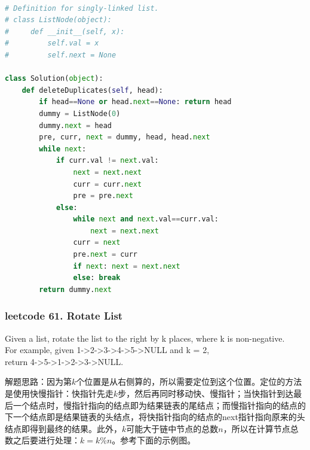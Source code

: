 \documentclass[a4paper,10pt]{article}
\begin{document}
\begin{lstlisting}[language=Python, caption=Problem82. Remove Duplicates from Sorted List II]

# Definition for singly-linked list.
# class ListNode(object):
#     def __init__(self, x):
#         self.val = x
#         self.next = None

class Solution(object):
    def deleteDuplicates(self, head):
        if head==None or head.next==None: return head
        dummy = ListNode(0)
        dummy.next = head
        pre, curr, next = dummy, head, head.next
        while next:
            if curr.val != next.val:
                next = next.next
                curr = curr.next
                pre = pre.next
            else:
                while next and next.val==curr.val:
                    next = next.next
                curr = next
                pre.next = curr
                if next: next = next.next
                else: break
        return dummy.next
\end{lstlisting}



\subsubsection{leetcode 61. Rotate List}
Given a list, rotate the list to the right by k places, where k is non-negative. \\

\noindent For example, given 1->2->3->4->5->NULL and k = 2, \\
\indent return 4->5->1->2->3->NULL. \\

\begin{CJK*}{UTF8}{gbsn}
\noindent 解题思路：因为第$k$个位置是从右侧算的，所以需要定位到这个位置。定位的方法是使用快慢指针：快指针先走$k$步，然后再同时移动快、慢指针；当快指针到达最后一个结点时，慢指针指向的结点即为结果链表的尾结点；而慢指针指向的结点的下一个结点即是结果链表的头结点，将快指针指向的结点的next指针指向原来的头结点即得到最终的结果。此外，$k$可能大于链中节点的总数$n$，所以在计算节点总数之后要进行处理：$k=k\%n$。参考下面的示例图。\\
\end{CJK*}
\end{document}
